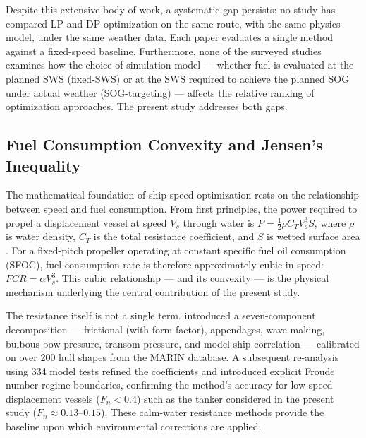 \documentclass[review]{elsarticle}
\begin{document}
Despite this extensive body of work, a systematic gap persists: no study has compared LP and DP optimization on the same route, with the same physics model, under the same weather data. Each paper evaluates a single method against a fixed-speed baseline. Furthermore, none of the surveyed studies examines how the choice of simulation model --- whether fuel is evaluated at the planned SWS (fixed-SWS) or at the SWS required to achieve the planned SOG under actual weather (SOG-targeting) --- affects the relative ranking of optimization approaches. The present study addresses both gaps.

\subsection{Fuel Consumption Convexity and Jensen's Inequality}
\label{sec:lit-convexity}

The mathematical foundation of ship speed optimization rests on the relationship between speed and fuel consumption. From first principles, the power required to propel a displacement vessel at speed $V_s$ through water is $P = \frac{1}{2} \rho C_T V_s^3 S$, where $\rho$ is water density, $C_T$ is the total resistance coefficient, and $S$ is wetted surface area \cite{Psaraftis2023}. For a fixed-pitch propeller operating at constant specific fuel oil consumption (SFOC), fuel consumption rate is therefore approximately cubic in speed: $FCR = \alpha V_s^3$. This cubic relationship --- and its convexity --- is the physical mechanism underlying the central contribution of the present study.

The resistance itself is not a single term. \cite{Holtrop1982} introduced a seven-component decomposition --- frictional (with form factor), appendages, wave-making, bulbous bow pressure, transom pressure, and model-ship correlation --- calibrated on over 200 hull shapes from the MARIN database. A subsequent re-analysis using 334 model tests \cite{Holtrop1984} refined the coefficients and introduced explicit Froude number regime boundaries, confirming the method's accuracy for low-speed displacement vessels ($F_n < 0.4$) such as the tanker considered in the present study ($F_n \approx 0.13$--$0.15$). These calm-water resistance methods provide the baseline upon which environmental corrections are applied.
\end{document}

